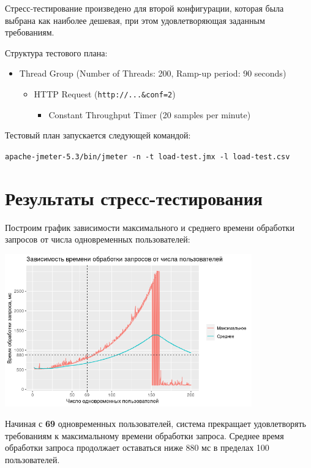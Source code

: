 \documentclass[listings]{labreport}
\begin{document}
Стресс-тестирование произведено для второй конфигурации, которая была выбрана
как наиболее дешевая, при этом удовлетворяющая заданным требованиям.

Структура тестового плана:
\begin{itemize}[noitemsep,topsep=0em,label=$\bullet$]
  \item Thread Group (Number of Threads: 200, Ramp-up period: 90 seconds)
    \begin{itemize}[noitemsep,topsep=0em,label=$\bullet$]
      \item HTTP Request (\verb|http://...&conf=2|)
        \begin{itemize}[noitemsep,topsep=0em,label=$\bullet$]
          \item Constant Throughput Timer (20 samples per minute)
        \end{itemize}
    \end{itemize}
\end{itemize}

Тестовый план запускается следующей командой:

\verb|apache-jmeter-5.3/bin/jmeter -n -t load-test.jmx -l load-test.csv|

\section*{Результаты стресс-тестирования}

Построим график зависимости максимального и среднего времени обработки запросов
от числа одновременных пользователей:

\vspace{0.4em}
\includegraphics[width=0.8\textwidth]{Lab4/Stress-Test-Response-Time-Plot.png}

Начиная с \textbf{69} одновременных пользователей, система прекращает удовлетворять
требованиям к максимальному времени обработки запроса. Среднее время обработки
запроса продолжает оставаться ниже 880 мс в пределах 100 пользователей.
\end{document}

